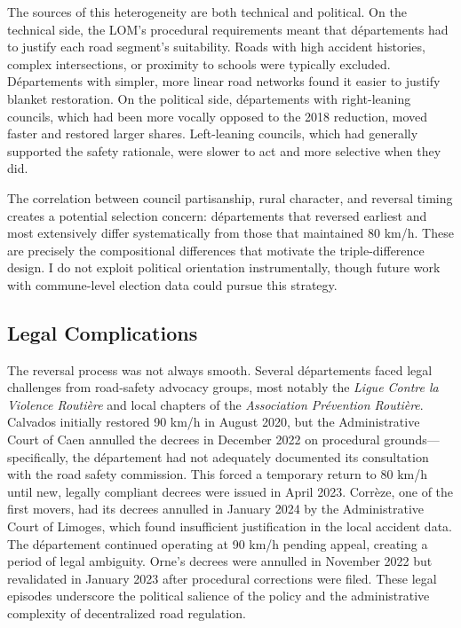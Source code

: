 \documentclass[12pt]{article}
\begin{document}
The sources of this heterogeneity are both technical and political. On the technical side, the LOM's procedural requirements meant that d\'{e}partements had to justify each road segment's suitability. Roads with high accident histories, complex intersections, or proximity to schools were typically excluded. D\'{e}partements with simpler, more linear road networks found it easier to justify blanket restoration. On the political side, d\'{e}partements with right-leaning councils, which had been more vocally opposed to the 2018 reduction, moved faster and restored larger shares. Left-leaning councils, which had generally supported the safety rationale, were slower to act and more selective when they did.

The correlation between council partisanship, rural character, and reversal timing creates a potential selection concern: d\'{e}partements that reversed earliest and most extensively differ systematically from those that maintained 80 km/h. These are precisely the compositional differences that motivate the triple-difference design. I do not exploit political orientation instrumentally, though future work with commune-level election data could pursue this strategy.

\subsection{Legal Complications}

The reversal process was not always smooth. Several d\'{e}partements faced legal challenges from road-safety advocacy groups, most notably the \textit{Ligue Contre la Violence Routi\`{e}re} and local chapters of the \textit{Association Pr\'{e}vention Routi\`{e}re}. Calvados initially restored 90 km/h in August 2020, but the Administrative Court of Caen annulled the decrees in December 2022 on procedural grounds---specifically, the d\'{e}partement had not adequately documented its consultation with the road safety commission. This forced a temporary return to 80 km/h until new, legally compliant decrees were issued in April 2023. Corr\`{e}ze, one of the first movers, had its decrees annulled in January 2024 by the Administrative Court of Limoges, which found insufficient justification in the local accident data. The d\'{e}partement continued operating at 90 km/h pending appeal, creating a period of legal ambiguity. Orne's decrees were annulled in November 2022 but revalidated in January 2023 after procedural corrections were filed. These legal episodes underscore the political salience of the policy and the administrative complexity of decentralized road regulation.
\end{document}
